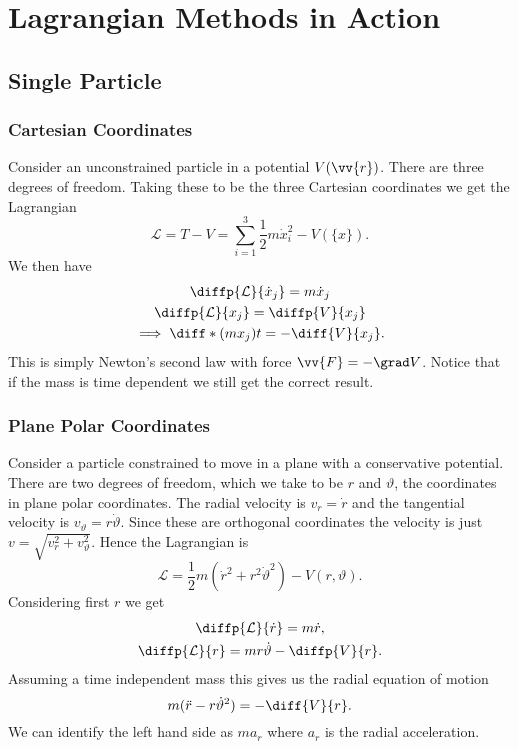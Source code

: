 \documentclass[fleqn]{NotesClass}
\newcommand*{\lagrangian}{\mathcal{L}}
\begin{document}
    \chapter{Lagrangian Methods in Action}
    \section{Single Particle}
    \subsection{Cartesian Coordinates}
    Consider an unconstrained particle in a potential \(V(\vv{r})\).
    There are three degrees of freedom.
    Taking these to be the three Cartesian coordinates we get the Lagrangian
    \begin{equation}
        \lagrangian = T - V = \sum_{i=1}^{3} \frac{1}{2}m\dot{x}_i^2 - V(\{x\}).
    \end{equation}
    We then have
    \begin{gather}
        \diffp{\lagrangian}{\dot{x}_j} = m\dot{x}_j\\
        \diffp{\lagrangian}{x_j} = \diffp{V}{x_j}\\
        \implies \diff*{(mx_j)}{t} = -\diff{V}{x_j}.
    \end{gather}
    This is simply Newton's second law with force \(\vv{F} = -\grad V\).
    Notice that if the mass is time dependent we still get the correct result.
    
    \subsection{Plane Polar Coordinates}
    Consider a particle constrained to move in a plane with a conservative potential.
    There are two degrees of freedom, which we take to be \(r\) and \(\vartheta\), the coordinates in plane polar coordinates.
    The radial velocity is \(v_r = \dot{r}\) and the tangential velocity is \(v_{\vartheta} = r\dot{\vartheta}\).
    Since these are orthogonal coordinates the velocity is just \(v = \sqrt{v_r^2 + v_\vartheta^2}\).
    Hence the Lagrangian is
    \begin{equation}
        \lagrangian = \frac{1}{2}m(\dot{r}^2 + r^2\dot{\vartheta}^2) - V(r, \vartheta).
    \end{equation}
    Considering first \(r\) we get
    \begin{gather}
        \diffp{\lagrangian}{\dot{r}} = m\dot{r},\\
        \diffp{\lagrangian}{r} = mr\dot{\vartheta} - \diffp{V}{r}.
    \end{gather}
    Assuming a time independent mass this gives us the radial equation of motion
    \begin{equation}
        m(\ddot{r} - r\dot{\vartheta}^2) = -\diff{V}{r}.
    \end{equation}
    We can identify the left hand side as \(ma_r\) where \(a_r\) is the radial acceleration.
    
\end{document}
